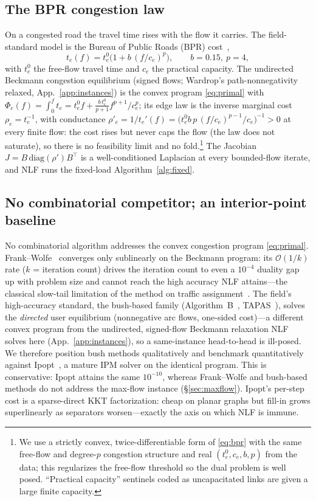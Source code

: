 \documentclass{siamart220329}
\begin{document}
\subsection{The BPR congestion law}\label{sec:bpr}
On a congested road the travel time rises with the flow it carries. The field-standard model is the
Bureau of Public Roads (BPR) cost~\cite{bpr},
\begin{equation}\label{eq:bpr}
t_e(f)=t^0_e\Big(1+b\,(f/c_e)^{p}\Big),\qquad b=0.15,\ p=4 ,
\end{equation}
with $t^0_e$ the free-flow travel time and $c_e$ the practical capacity. The undirected Beckmann
congestion equilibrium (signed flows; Wardrop's path-nonnegativity relaxed, App.~\ref{app:instances})
is the convex program \eqref{eq:primal} with
$\Phi_e(f)=\int_0^f t_e=t^0_e f+\tfrac{b\,t^0_e}{p+1}f^{p+1}/c_e^{p}$; its edge law is the inverse
marginal cost $\rho_e=t_e^{-1}$, with conductance
$\rho'_e=1/t_e'(f)=\big(t^0_e b\,p\,(f/c_e)^{p-1}/c_e\big)^{-1}>0$ at every finite flow: the cost
rises but never caps the flow (the law does not saturate), so there is no feasibility limit and no fold.\footnote{We use a strictly convex, twice-differentiable form of
\eqref{eq:bpr} with the same free-flow and degree-$p$ congestion structure and real $(t^0_e,c_e,b,p)$
from the data; this regularizes the free-flow threshold so the dual problem is well posed. ``Practical
capacity'' sentinels coded as uncapacitated links are given a large finite capacity.}
The Jacobian $J=B\,\mathrm{diag}(\rho')B^{\top}$ is a well-conditioned Laplacian at every
bounded-flow iterate, and NLF runs the fixed-load Algorithm~\ref{alg:fixed}.

\subsection{No combinatorial competitor; an interior-point baseline}\label{sec:competitor}
No combinatorial algorithm addresses the convex congestion program \eqref{eq:primal}.
Frank--Wolfe~\cite{frankwolfe} converges only sublinearly on the Beckmann program: its
$\mathcal{O}(1/k)$ rate ($k$ = iteration count) drives the iteration count to even a $10^{-4}$ duality
gap up with problem size and cannot reach the high accuracy NLF attains---the classical slow-tail
limitation of the method on traffic assignment~\cite{boyles-tna}. The field's high-accuracy standard, the
bush-based family (Algorithm~B~\cite{bargera2002}, TAPAS~\cite{bargera2010}), solves the
\emph{directed} user equilibrium (nonnegative arc flows, one-sided cost)---a different convex program
from the undirected, signed-flow Beckmann relaxation NLF solves here (App.~\ref{app:instances}), so a
same-instance head-to-head is ill-posed. We therefore position bush methods qualitatively and
benchmark quantitatively against Ipopt~\cite{ipopt}, a mature IPM solver on the identical program. This is conservative: Ipopt attains the same $10^{-10}$, whereas
Frank--Wolfe and bush-based methods do not address the max-flow instance (\S\ref{sec:maxflow}).
Ipopt's per-step cost is a sparse-direct KKT factorization: cheap on planar graphs but
fill-in grows superlinearly as separators worsen---exactly the axis on which NLF is immune.
\end{document}
